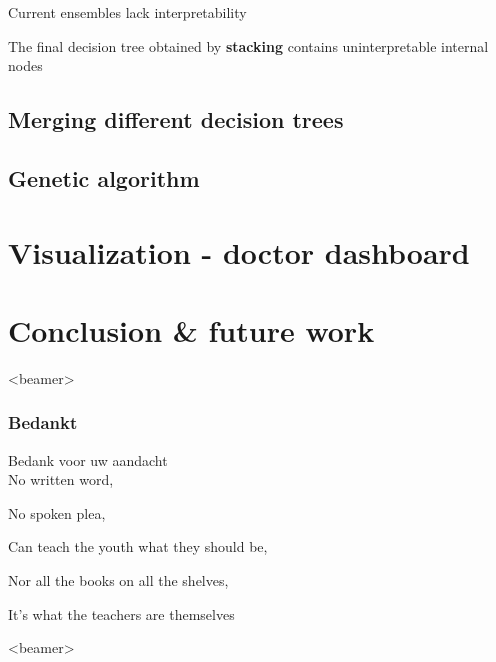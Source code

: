 \documentclass[english]{beamer}
\begin{document}
\begin{frame}{Current ensembles lack interpretability}
	\begin{block}{}
		The final decision tree obtained by \textbf{stacking} contains uninterpretable internal nodes
	\end{block}
	
	\vspace{2em}
	
	
\end{frame}

\subsection*{Merging different decision trees}

\subsection*{Genetic algorithm}
\section{Visualization - doctor dashboard}
\section{Conclusion \& future work}






\begin{frame}<beamer> 
  \frametitle{Bedankt}
	  {\huge \color{ugentyellow} Bedank voor uw aandacht}\\
	  No written word,
	  
	  No spoken plea,
	  
	  Can teach the youth what they should be,
	  
	  Nor all the books on all the shelves,
	  
	  It's what the teachers are themselves 
\end{frame}

\begin{frame}<beamer> 
	\small
	\tableofcontents
\end{frame}
\end{document}
